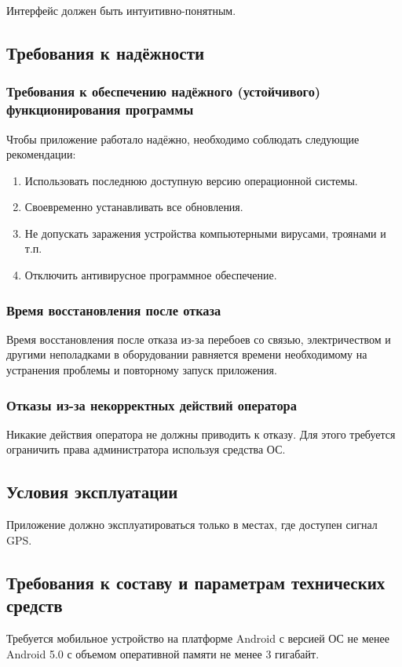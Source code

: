 Интерфейс должен быть интуитивно-понятным.

\subsection{Требования к надёжности}
\label{requirements.quality}

\subsubsection{Требования к обеспечению надёжного (устойчивого) функционирования программы}
Чтобы приложение работало надёжно, необходимо соблюдать следующие рекомендации:
\begin{enumerate}
	\item Использовать последнюю доступную версию операционной системы.
	\item Своевременно устанавливать все обновления.
	\item Не допускать заражения устройства компьютерными вирусами, троянами и т.п.
	\item Отключить антивирусное программное обеспечение.
\end{enumerate}

\subsubsection{Время восстановления после отказа}
Время восстановления после отказа из-за перебоев со связью, электричеством и другими неполадками в оборудовании равняется времени необходимому на устранения проблемы и повторному запуск приложения.

\subsubsection{Отказы из-за некорректных действий оператора}
Никакие действия оператора не должны приводить к отказу. Для этого требуется ограничить права администратора используя средства ОС.

\subsection{Условия эксплуатации}
Приложение должно эксплуатироваться только в местах, где доступен сигнал GPS.

\subsection{Требования к составу и параметрам технических средств}
Требуется мобильное устройство на платформе Android с версией ОС не менее Android 5.0 с объемом оперативной памяти не менее 3 гигабайт.

